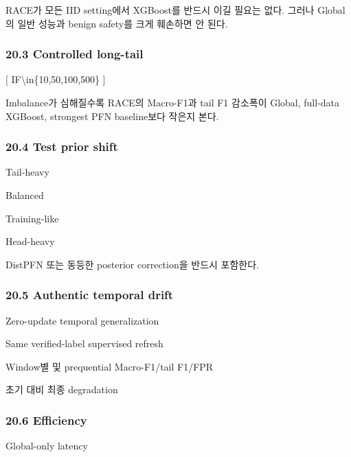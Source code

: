 RACE가 모든 IID setting에서 XGBoost를 반드시 이길 필요는 없다. 그러나 Global의 일반 성능과 benign safety를 크게 훼손하면 안 된다.

\subsubsection{20.3 Controlled long-tail}
[ IF\textbackslash{}in\{10,50,100,500\} ]

Imbalance가 심해질수록 RACE의 Macro-F1과 tail F1 감소폭이 Global, full-data XGBoost, strongest PFN baseline보다 작은지 본다.

\subsubsection{20.4 Test prior shift}
\par\noindent \textbullet\enspace Tail-heavy


\par\noindent \textbullet\enspace Balanced


\par\noindent \textbullet\enspace Training-like


\par\noindent \textbullet\enspace Head-heavy


DistPFN 또는 동등한 posterior correction을 반드시 포함한다.

\subsubsection{20.5 Authentic temporal drift}
\par\noindent \textbullet\enspace Zero-update temporal generalization


\par\noindent \textbullet\enspace Same verified-label supervised refresh


\par\noindent \textbullet\enspace Window별 및 prequential Macro-F1/\allowbreak{}tail F1/\allowbreak{}FPR


\par\noindent \textbullet\enspace 초기 대비 최종 degradation


\subsubsection{20.6 Efficiency}
\par\noindent \textbullet\enspace Global-only latency


